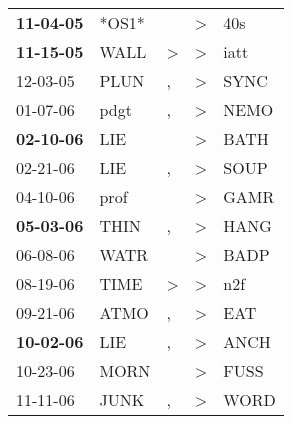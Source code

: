 \begin{supertabular}{p{0.07\textwidth}p{0.06\textwidth}p{0.02\textwidth}p{0.02\textwidth}p{0.06\textwidth}}
 \textbf{11-04-05\textsuperscript{}} &                            *OS1* &                  &     \textgreater &            40s\textsuperscript{} \\
 \textbf{11-15-05\textsuperscript{}} &           WALL\textsuperscript{} &     \textgreater &     \textgreater &           iatt\textsuperscript{} \\
          12-03-05\textsuperscript{} &           PLUN\textsuperscript{} &                , &     \textgreater &           SYNC\textsuperscript{} \\
          01-07-06\textsuperscript{} &           pdgt\textsuperscript{} &                , &     \textgreater &           NEMO\textsuperscript{} \\
 \textbf{02-10-06\textsuperscript{}} &            LIE\textsuperscript{} &                  &     \textgreater &           BATH\textsuperscript{} \\
          02-21-06\textsuperscript{} &            LIE\textsuperscript{} &                , &     \textgreater &           SOUP\textsuperscript{} \\
          04-10-06\textsuperscript{} &           prof\textsuperscript{} &                  &     \textgreater &           GAMR\textsuperscript{} \\
 \textbf{05-03-06\textsuperscript{}} &           THIN\textsuperscript{} &                , &     \textgreater &           HANG\textsuperscript{} \\
          06-08-06\textsuperscript{} &           WATR\textsuperscript{} &                  &     \textgreater &           BADP\textsuperscript{} \\
          08-19-06\textsuperscript{} &           TIME\textsuperscript{} &     \textgreater &     \textgreater &            n2f\textsuperscript{} \\
          09-21-06\textsuperscript{} &           ATMO\textsuperscript{} &                , &     \textgreater &            EAT\textsuperscript{} \\
 \textbf{10-02-06\textsuperscript{}} &            LIE\textsuperscript{} &                , &     \textgreater &           ANCH\textsuperscript{} \\
          10-23-06\textsuperscript{} &           MORN\textsuperscript{} &                  &     \textgreater &           FUSS\textsuperscript{} \\
          11-11-06\textsuperscript{} &           JUNK\textsuperscript{} &                , &     \textgreater &           WORD\textsuperscript{} \\

\end{supertabular}
